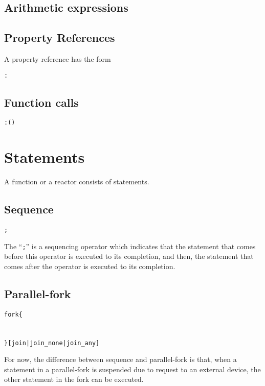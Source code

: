 \documentclass{note}\usepackage{mathptm,mydef}
\begin{document}
\subsection{Arithmetic expressions}

\subsection{Property References}
A property reference has the form
\begin{alltt}
  \textcolor{red2}{\textrm{}:\textrm{}}
\end{alltt}

\subsection{Function calls}
\begin{alltt}
  \textcolor{red2}{\textrm{}:\textrm{}(\textrm{})}
\end{alltt}


\section{Statements}
A function or a reactor consists of statements.

\subsection{Sequence}
\begin{alltt}
  \textcolor{red2}{\textrm{} ; 
  \textrm{}}
\end{alltt}
The ``\textcolor{red2}{\texttt{;}}'' is a sequencing operator which indicates
that the statement that comes before this operator is executed to its
completion, and then, the statement that comes after the operator is executed
to its completion.

\subsection{Parallel-fork}
\begin{alltt}
  \textcolor{red2}{fork \{
    \textrm{}
    \textrm{}
  \} \textrm{[}join \textrm{|} join_none \textrm{|} join_any \textrm{]}}
\end{alltt}
For now, the difference between sequence and parallel-fork is  that, when a
statement in a parallel-fork is suspended due to request to an external
device, the other statement in the fork can be executed.
\end{document}
